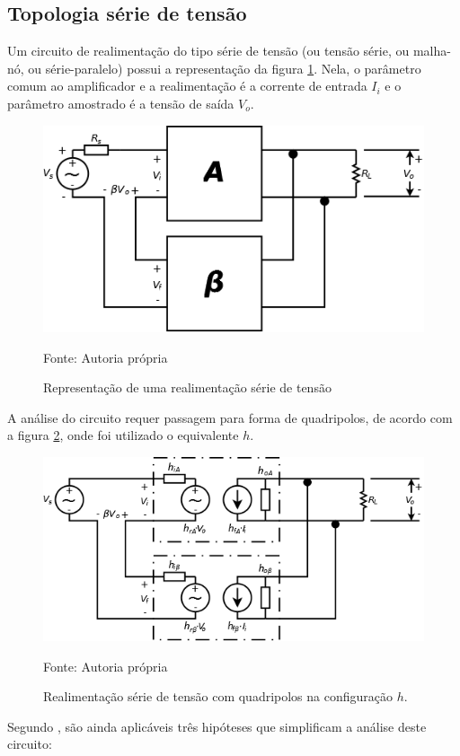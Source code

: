 \documentclass[openright]{normas-utf-tex} %
\begin{document}
\subsection{Topologia série de tensão}

Um circuito de realimentação do tipo série de tensão (ou tensão série, ou malha-nó, ou série-paralelo) possui a representação da figura \ref{fig:serie_tensao}. Nela, o parâmetro comum ao amplificador e a realimentação é a corrente de entrada $I_i$ e o parâmetro amostrado é a tensão de saída $V_o$. \cite{millman,pedroni}

\begin{figure}[ht]
\centering
\includegraphics[width=0.75\linewidth]{img/SerieTensao.png}
\caption{Representação de uma realimentação série de tensão}
Fonte: Autoria própria
\label{fig:serie_tensao}
\end{figure}

A análise do circuito requer passagem para forma de quadripolos, de acordo com a figura \ref{fig:serie_tensao_quad}, onde foi utilizado o equivalente $h$.  \cite{millman,pedroni}

\begin{figure}[ht]
\centering
\includegraphics[width=0.75\linewidth]{img/SerieTensaoQuad.png}
\caption{Realimentação série de tensão com quadripolos na configuração $h$.}
Fonte: Autoria própria
\label{fig:serie_tensao_quad}
\end{figure}

Segundo , são ainda aplicáveis três hipóteses que simplificam a análise deste circuito:
\end{document}
